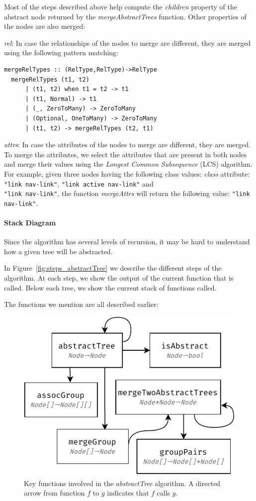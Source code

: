 Most of the steps described above help compute the \emph{children} property of the abstract node returned by the \emph{mergeAbstractTrees} function.
Other properties of the nodes are also merged: 
\begin{compactdesc}
\item[\emph{rel}:] In case the relationships of the nodes to merge are different, they are merged using the following pattern matching:
\begin{lstlisting}[basicstyle=\small]
  mergeRelTypes :: (RelType,RelType)->RelType
  mergeRelTypes (t1, t2)
      | (t1, t2) when t1 = t2 -> t1
      | (t1, Normal) -> t1
      | (_, ZeroToMany) -> ZeroToMany
      | (Optional, OneToMany) -> ZeroToMany
      | (t1, t2) -> mergeRelTypes (t2, t1)
\end{lstlisting}

\item[\emph{attrs}:] In case the attributes of the nodes to merge are different, they are merged.
To merge the attributes, we select the attributes that are present in both nodes and merge their values using the \emph{Longest Common Subsequence} (LCS) algorithm.
For example, given three nodes having the following class values:  \emph{class} attribute: \lstinline{"link nav-link"}, \lstinline{"link active nav-link"} and \\\lstinline{"link nav-link"}, the function \emph{mergeAttrs}  will return the following value: \lstinline{"link nav-link"}.
\end{compactdesc}

\paragraph{Stack Diagram}
Since the algorithm has several levels of recursion, it may be hard to understand how a given tree will be abstracted. 

In Figure~\ref{fig:steps_abstractTree} we describe the different steps of the algorithm.
At each step, we show the output of the current function that is called.
Below each tree, we show the current stack of functions called.

The functions we mention are all described earlier:
\begin{figure}[]
  \centering
  \includegraphics[width=0.7\linewidth]{appstract/explanations/functions_relations}
  \caption{Key functions involved in the \emph{abstractTree} algorithm. A directed arrow from function $f$ to $g$ indicates that $f$ calls $g$.}
  \label{fig:functions_relations}
\end{figure}

